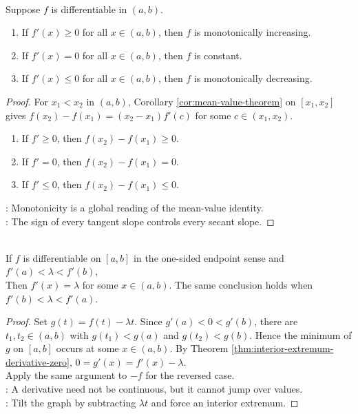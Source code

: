 \begin{theorem} \label{thm:derivative-sign-monotonicity} \\
Suppose $f$ is differentiable in $(a,b)$.
\begin{enumerate}[label=(\roman*)]
\setlength{\itemsep}{0pt}
\item If $f'(x)\geq0$ for all $x\in(a,b)$, then $f$ is monotonically increasing.
\item If $f'(x)=0$ for all $x\in(a,b)$, then $f$ is constant.
\item If $f'(x)\leq0$ for all $x\in(a,b)$, then $f$ is monotonically decreasing.
\end{enumerate}
\begin{proof} For $x_1<x_2$ in $(a,b)$, Corollary \ref{cor:mean-value-theorem} on $[x_1,x_2]$ gives $f(x_2)-f(x_1)=(x_2-x_1)f'(c)$ for some $c\in(x_1,x_2)$.
\begin{enumerate}[label=(\roman*)]
\setlength{\itemsep}{0pt}
\item If $f'\geq0$, then $f(x_2)-f(x_1)\geq0$.
\item If $f'=0$, then $f(x_2)-f(x_1)=0$.
\item If $f'\leq0$, then $f(x_2)-f(x_1)\leq0$.
\end{enumerate}
: Monotonicity is a global reading of the mean-value identity.\\
: The sign of every tangent slope controls every secant slope.
\end{proof}
\end{theorem}

\begin{theorem} \label{thm:derivatives-have-intermediate-value-property} \\
If $f$ is differentiable on $[a,b]$ in the one-sided endpoint sense and $f'(a)<\lambda<f'(b)$,\\
Then $f'(x)=\lambda$ for some $x\in(a,b)$. The same conclusion holds when $f'(b)<\lambda<f'(a)$.
\begin{proof}
Set $g(t)=f(t)-\lambda t$. Since $g'(a)<0<g'(b)$, there are $t_1,t_2\in(a,b)$ with $g(t_1)<g(a)$ and $g(t_2)<g(b)$. Hence the minimum of $g$ on $[a,b]$ occurs at some $x\in(a,b)$. By Theorem \ref{thm:interior-extremum-derivative-zero}, $0=g'(x)=f'(x)-\lambda$.\\
Apply the same argument to $-f$ for the reversed case.\\
: A derivative need not be continuous, but it cannot jump over values.\\
: Tilt the graph by subtracting $\lambda t$ and force an interior extremum.
\end{proof}
\end{theorem}

